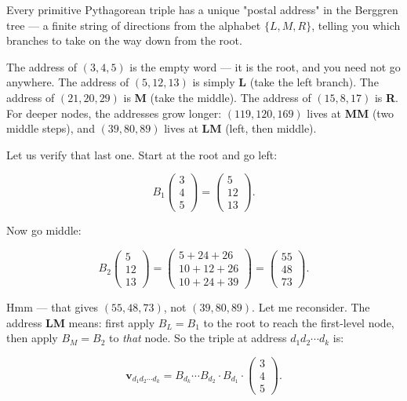 

Every primitive Pythagorean triple has a unique "postal address" in the Berggren tree --- a finite string of directions from the alphabet $\{L, M, R\}$, telling you which branches to take on the way down from the root.

The address of $(3, 4, 5)$ is the empty word --- it is the root, and you need not go anywhere. The address of $(5, 12, 13)$ is simply \textbf{L} (take the left branch). The address of $(21, 20, 29)$ is \textbf{M} (take the middle). The address of $(15, 8, 17)$ is \textbf{R}. For deeper nodes, the addresses grow longer: $(119, 120, 169)$ lives at \textbf{MM} (two middle steps), and $(39, 80, 89)$ lives at \textbf{LM} (left, then middle).

Let us verify that last one. Start at the root and go left:

\[B_1 \begin{pmatrix} 3 \\ 4 \\ 5 \end{pmatrix} = \begin{pmatrix} 5 \\ 12 \\ 13 \end{pmatrix}.\]

Now go middle:

\[B_2 \begin{pmatrix} 5 \\ 12 \\ 13 \end{pmatrix} = \begin{pmatrix} 5 + 24 + 26 \\ 10 + 12 + 26 \\ 10 + 24 + 39 \end{pmatrix} = \begin{pmatrix} 55 \\ 48 \\ 73 \end{pmatrix}.\]

Hmm --- that gives $(55, 48, 73)$, not $(39, 80, 89)$. Let me reconsider. The address \textbf{LM} means: first apply $B_L = B_1$ to the root to reach the first-level node, then apply $B_M = B_2$ to \textit{that} node. So the triple at address $d_1 d_2 \cdots d_k$ is:

\[\mathbf{v}_{d_1 d_2 \cdots d_k} = B_{d_k} \cdots B_{d_2} \cdot B_{d_1} \cdot \begin{pmatrix} 3 \\ 4 \\ 5 \end{pmatrix}.\]

